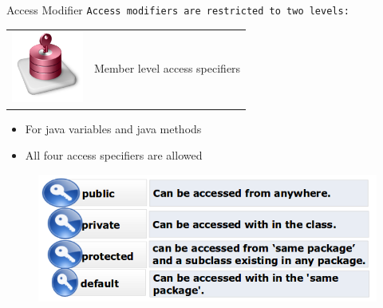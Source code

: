 \documentclass[14pt]{beamer}
\begin{document}
\begin{frame}{Access Modifier}
 \texttt{Access modifiers are restricted to two levels:}
 \begin{tabular}{l l}
\begin{minipage}{0.1\textwidth}
\includegraphics[scale=.4]{member-level-access-specifier.png}
\end{minipage}
&
\begin{minipage}{0.85\textwidth}
Member level access specifiers
\end{minipage}
\end{tabular} 
\begin{itemize}
 \item For java variables and java methods
 \item All four access specifiers are allowed
\end{itemize}
\begin{figure}[H]
 \begin{center}
   \includegraphics[scale=.3]{public-private-protected-default.png}   
 \end{center}
  \end{figure}
\end{frame}
\end{document}
